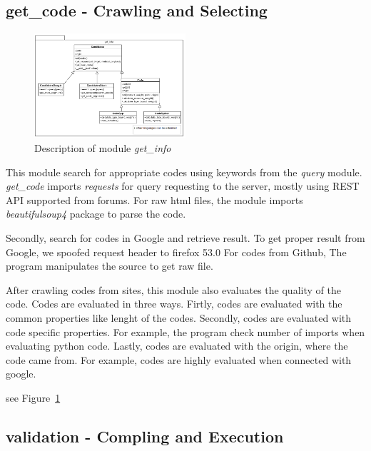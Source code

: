 \documentclass[conference]{IEEEtran}
\begin{document}
\subsection{get\_code - Crawling and Selecting} %
\label{sub:get_code}
\begin{figure}[ht]
\centering
\includegraphics[width=0.5\textwidth]{./figures/get_info.png}
\caption{Description of module \textit{get\_info}}
\label{get_info}
\end{figure}

This module search for appropriate codes using keywords from the \textit{query} module.
\textit{get\_code} imports \textit{requests} for query requesting to the server, mostly using REST API supported from forums.
For raw html files, the module imports \textit{beautifulsoup4} package to parse the code.

Secondly, search for codes in Google and retrieve result.
To get proper result from Google, we spoofed request header to firefox 53.0
For codes from Github, The program manipulates the source to get raw file.

After crawling codes from sites, this module also evaluates the quality of the code.
Codes are evaluated in three ways.
Firtly, codes are evaluated with the common properties like lenght of the codes.
Secondly, codes are evaluated with code specific properties. 
For example, the program check number of imports when evaluating python code.
Lastly, codes are evaluated with the origin, where the code came from.
For example, codes are highly evaluated when connected with google.

see Figure~\ref{get_info}

\subsection{validation - Compling and Execution} %
\label{sub:validation}
\end{document}
